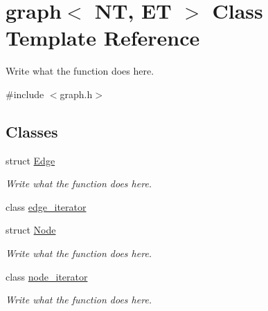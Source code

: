 \hypertarget{classgraph}{\section{graph$<$ N\+T, E\+T $>$ Class Template Reference}
\label{classgraph}
}


Write what the function does here.  




{\ttfamily \#include $<$graph.\+h$>$}

\subsection*{Classes}
\begin{DoxyCompactItemize}
\item 
struct \hyperlink{structgraph_1_1Edge}{Edge}
\begin{DoxyCompactList}\small\item\em Write what the function does here. \end{DoxyCompactList}\item 
class \hyperlink{classgraph_1_1edge__iterator}{edge\+\_\+iterator}
\item 
struct \hyperlink{structgraph_1_1Node}{Node}
\begin{DoxyCompactList}\small\item\em Write what the function does here. \end{DoxyCompactList}\item 
class \hyperlink{classgraph_1_1node__iterator}{node\+\_\+iterator}
\begin{DoxyCompactList}\small\item\em Write what the function does here. \end{DoxyCompactList}\end{DoxyCompactItemize}
